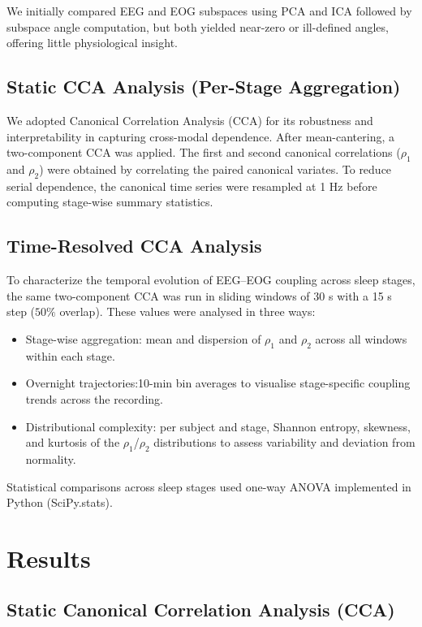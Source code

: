 We initially compared EEG and EOG subspaces using PCA and ICA followed by subspace angle computation, but both yielded near-zero or ill-defined angles, offering little physiological insight. 

\subsection{Static CCA Analysis (Per-Stage Aggregation)}

We adopted Canonical Correlation Analysis (CCA) for its robustness and interpretability in capturing cross-modal dependence. After mean-cantering, a two-component CCA was applied. The first and second canonical correlations ($\rho_1$ and $\rho_2$) were obtained by correlating the paired canonical variates. To reduce serial dependence, the canonical time series were resampled at 1 Hz before computing stage-wise summary statistics.

\subsection{Time-Resolved CCA Analysis}

To characterize the temporal evolution of EEG–EOG coupling across sleep stages, the same two-component CCA was run in sliding windows of 30 s with a 15 s step ($50\%$ overlap). These values were analysed in three ways:
\begin{itemize}
    \item Stage-wise aggregation: mean and dispersion of $\rho_1$ and $\rho_2$ across all windows within each stage.
    \item Overnight trajectories:10-min bin averages to visualise stage-specific coupling trends across the recording.
    \item Distributional complexity: per subject and stage, Shannon entropy, skewness, and kurtosis of the $\rho_1$/$\rho_2$ distributions to assess variability and deviation from normality.
\end{itemize}

Statistical comparisons across sleep stages used one-way ANOVA implemented in Python (SciPy.stats).

\section{Results}

\subsection{Static Canonical Correlation Analysis (CCA)}


